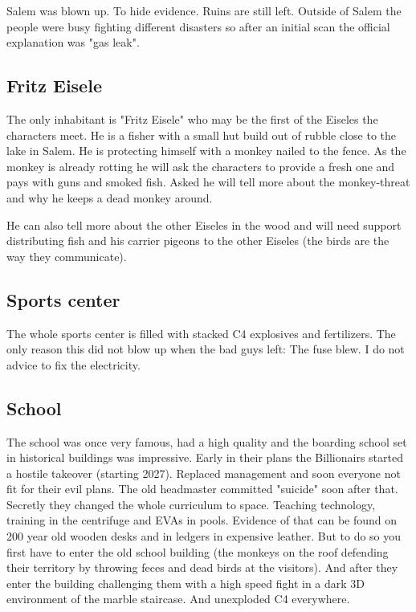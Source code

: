Salem was blown up. To hide evidence. Ruins are still left. Outside of Salem the people were busy fighting different disasters so after an initial scan the official explanation was "gas leak".

\subsection{Fritz Eisele}
The only inhabitant is "Fritz Eisele" who may be the first of the Eiseles the characters meet. He is a fisher with a small hut build out of rubble close to the lake in Salem.
He is protecting himself with a monkey nailed to the fence. As the monkey is already rotting he will ask the characters to provide a fresh one and pays with guns and smoked fish.
Asked he will tell more about the monkey-threat and why he keeps a dead monkey around.

He can also tell more about the other Eiseles in the wood and will need support distributing fish and his carrier pigeons to the other Eiseles (the birds are the way they communicate).

\subsection{Sports center}

The whole sports center is filled with stacked C4 explosives and fertilizers. The only reason this did not blow up when the bad guys left: The fuse blew. I do not advice to fix the electricity.


\subsection{School}

The school was once very famous, had a high quality and the boarding school set in historical buildings was impressive. Early in their plans the Billionairs started a hostile takeover (starting 2027). Replaced management and soon everyone not fit for their evil plans. The old headmaster committed "suicide" soon after that.
Secretly they changed the whole curriculum to space. Teaching technology, training in the centrifuge and EVAs in pools.
Evidence of that can be found on 200 year old wooden desks and in ledgers in expensive leather.
But to do so you first have to enter the old school building (the monkeys on the roof defending their territory by throwing feces and dead birds at the visitors). And after they enter the building challenging them with a high speed fight in a dark 3D environment of the marble staircase. And unexploded C4 everywhere.

